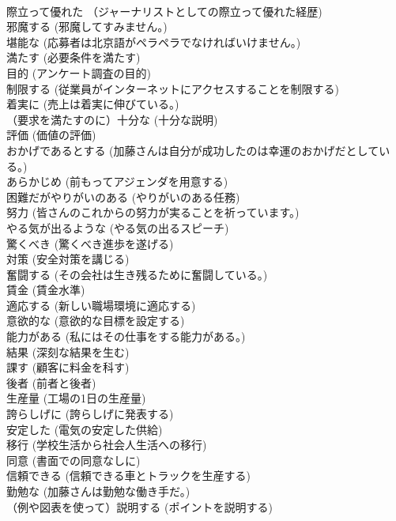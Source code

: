 \documentclass[8pt]{extreport}
\begin{document}
\begin{CJK}{UTF8}{min}
\\	際立って優れた	（ジャーナリストとしての際立って優れた経歴)		
\\	邪魔する	(邪魔してすみません。)		
\\	堪能な	(応募者は北京語がペラペラでなければいけません。)		
\\	満たす	(必要条件を満たす)		
\\	目的	(アンケート調査の目的)		
\\	制限する	(従業員がインターネットにアクセスすることを制限する)		
\\	着実に	(売上は着実に伸びている。)		
\\	（要求を満たすのに）十分な	(十分な説明)		
\\	評価	(価値の評価)		
\\	おかげであるとする	(加藤さんは自分が成功したのは幸運のおかげだとしている。)		
\\	あらかじめ	(前もってアジェンダを用意する)		
\\	困難だがやりがいのある	(やりがいのある任務)		
\\	努力	(皆さんのこれからの努力が実ることを祈っています。)		
\\	やる気が出るような	(やる気の出るスピーチ)		
\\	驚くべき	(驚くべき進歩を遂げる)		
\\	対策	(安全対策を講じる)		
\\	奮闘する	(その会社は生き残るために奮闘している。)		
\\	賃金	(賃金水準)		
\\	適応する	(新しい職場環境に適応する)		
\\	意欲的な	(意欲的な目標を設定する)		
\\	能力がある	(私にはその仕事をする能力がある。)		
\\	結果	(深刻な結果を生む)		
\\	課す	(顧客に料金を科す)		
\\	後者	(前者と後者)		
\\	生産量	(工場の1日の生産量)		
\\	誇らしげに	(誇らしげに発表する)		
\\	安定した	(電気の安定した供給)		
\\	移行	(学校生活から社会人生活への移行)		
\\	同意	(書面での同意なしに)		
\\	信頼できる	(信頼できる車とトラックを生産する)		
\\	勤勉な	(加藤さんは勤勉な働き手だ。)		
\\	（例や図表を使って）説明する	(ポイントを説明する)		

\end{CJK}
\end{document}
